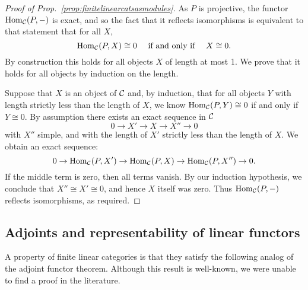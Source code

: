 \documentclass{amsart}
\begin{document}
\begin{proof}[Proof of Prop.~\ref{prop:finitelinearcatsasmodules}]
As $P$ is projective, the functor $\operatorname{Hom}_{\mathcal C}(P,-)$ is exact, and so the fact that it reflects isomorphisms is equivalent to that statement that for all $X$, 
\begin{equation*}
	\operatorname{Hom}_{\mathcal C}(P,X) \cong 0 \quad \textrm{ if and only if } \quad X \cong 0.
\end{equation*} 
By construction this holds for all objects $X$ of length at most 1. We prove that it holds for all objects by induction on the length. 

Suppose that $X$ is an object of $\mathcal C$ and, by induction, that for all objects $Y$ with length strictly less than the length of $X$, we know $\operatorname{Hom}_{\mathcal C}(P,Y) \cong 0$ if and only if $Y \cong 0$. By assumption there exists an exact sequence in $\mathcal C$
\begin{equation*}
	0 \to X' \to X \to X'' \to 0
\end{equation*}
with $X''$ simple, and with the length of $X'$ strictly less than the length of $X$. We obtain an exact sequence:
\begin{equation*}
	0 \to \operatorname{Hom}_{\mathcal C}(P,X') \to \operatorname{Hom}_{\mathcal C}(P,X) \to \operatorname{Hom}_{\mathcal C}(P,X'') \to 0.
\end{equation*}
If the middle term is zero, then all terms vanish. By our induction hypothesis, we conclude that $X'' \cong X' \cong 0$, and hence $X$ itself was zero. Thus $\operatorname{Hom}_{\mathcal C}(P,-)$ reflects isomorphisms, as required.
\end{proof}

\subsection{Adjoints and representability of linear functors}

A property of finite linear categories is that they satisfy the following analog of the adjoint functor theorem.  Although this result is well-known, we were unable to find a proof in the literature.  
\end{document}
